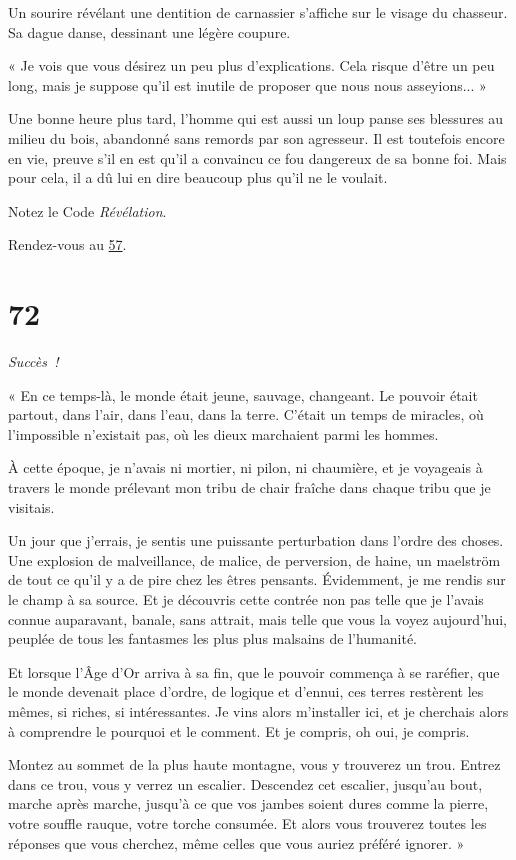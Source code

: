 \documentclass{report}
\newcommand{\gsection}[1]{
    \section{#1}
    \label{section-#1}
}
\newcommand{\glink}[1]{\hyperref[section-#1]{#1}}
\newcommand{\success}{\emph{Succès !}}
\begin{document}
Un sourire révélant une dentition de carnassier s'affiche sur le visage du chasseur. Sa dague danse, dessinant une légère coupure.

« Je vois que vous désirez un peu plus d'explications. Cela risque d'être un peu long, mais je suppose qu'il est inutile de proposer que nous nous asseyions... » 

Une bonne heure plus tard, l'homme qui est aussi un loup panse ses blessures au milieu du bois, abandonné sans remords par son agresseur. Il est toutefois encore en vie, preuve s'il en est qu'il a convaincu ce fou dangereux de sa bonne foi. Mais pour cela, il a dû lui en dire beaucoup plus qu'il ne le voulait.

Notez le Code \emph{Révélation}.

Rendez-vous au \glink{57}.

\gsection{72}

\success

« En ce temps-là, le monde était jeune, sauvage, changeant. Le pouvoir était partout, dans l'air, dans l'eau, dans la terre. C'était un temps de miracles, où l'impossible n'existait pas, où les dieux marchaient parmi les hommes.

À cette époque, je n'avais ni mortier, ni pilon, ni chaumière, et je voyageais à travers le monde prélevant mon tribu de chair fraîche dans chaque tribu que je visitais.

Un jour que j'errais, je sentis une puissante perturbation dans l'ordre des choses. Une explosion de malveillance, de malice, de perversion, de haine, un maelström de tout ce qu'il y a de pire chez les êtres pensants. Évidemment, je me rendis sur le champ à sa source. Et je découvris cette contrée non pas telle que je l'avais connue auparavant, banale, sans attrait, mais telle que vous la voyez aujourd'hui, peuplée de tous les fantasmes les plus plus malsains de l'humanité.

Et lorsque l'Âge d'Or arriva à sa fin, que le pouvoir commença à se raréfier, que le monde devenait place d'ordre, de logique et d'ennui, ces terres restèrent les mêmes, si riches, si intéressantes. Je vins alors m'installer ici, et je cherchais alors à comprendre le pourquoi et le comment. Et je compris, oh oui, je compris.

Montez au sommet de la plus haute montagne, vous y trouverez un trou. Entrez dans ce trou, vous y verrez un escalier. Descendez cet escalier, jusqu'au bout, marche après marche, jusqu'à ce que vos jambes soient dures comme la pierre, votre souffle rauque, votre torche consumée. Et alors vous trouverez toutes les réponses que vous cherchez, même celles que vous auriez préféré ignorer. »
\end{document}
